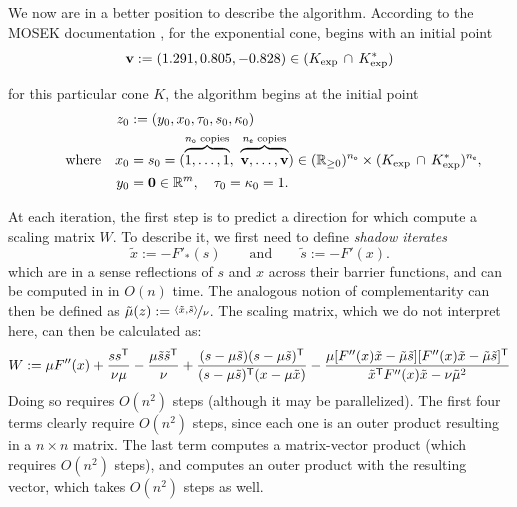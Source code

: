 \begin{subappendices}
\begin{lproof}
    We now are in a better position to describe the algorithm.
    According to the MOSEK documentation \parencite{dahl2022primal},
        for the exponential cone,
            begins with an initial point
        \[
            \mathbf v := (1.291, 0.805, -0.828) \in (K_{\exp} \,\cap\, K_{\exp}^*)
        \]

        for this particular cone $K$,
    the algorithm begins at the initial point
    \begin{align*}
        z_0 &:= (y_0, x_0, \tau_0, s_0, \kappa_0) \\
        \qquad
                    \text{where}\quad
                x_0 &= s_0 = (\overbrace{\vphantom| 1, \ldots, 1}^{n_{\sf o} \text{ copies}},~
                    \overbrace{\vphantom|
                        \mat v, \ldots, \mat v}^{n_{\sf e}\text{ copies}})
                \in (\mathbb R_{\ge 0})^{n_{\sf o}} \times (K_{\exp} \,\cap\, K_{\exp}^*)^{n_{\sf e}}, \\
            \qquad
                y_0 &= \mat 0  \in \mathbb R^m,
            \quad
                \tau_0 = \kappa_0 = 1.
    \end{align*}

    \def\daff#1{\Delta {#1}^{\text{aff}}}
    \def\dcen#1{\Delta {#1}^{\text{cen}}}

    At each iteration, the first step is to predict a direction for which
    \textcite{badenbroek2021algorithm}
    compute a scaling matrix $W$.
    To describe it, we first need to define \emph{shadow iterates}
    \[
        \tilde x := -F'_*(s)
        \qquad \text{and} \qquad
        \tilde s := - F'(x).
    \]
    which are in a sense reflections of $s$ and $x$ across their barrier functions, and can be computed in in $O(n)$ time.
    The analogous notion of complementarity can then be defined as $\tilde \mu(z) := \nicefrac{\langle \tilde x, \tilde s \rangle}{\nu}$.
    The scaling matrix, which we do not interpret here, can then be calculated as:
    \begin{equation}
        W :=
            \mu F''(x) + \frac{s s^{\sf T}}{\nu \mu}
            - \frac{\mu \tilde s \tilde s^{\sf T}}{\nu}
            + \frac{(s- \mu\tilde s)(s-\mu\tilde s)^{\sf T}}
                    {(s-\mu\tilde s)^{\sf T} (x - \mu \tilde x) }
            - \frac{\mu [ F''(x) \tilde x - \tilde \mu \tilde s]
                [ F''(x) \tilde x - \tilde \mu \tilde s]^{\sf T}}
                { \tilde x^{\sf T} F''(x) \tilde x - \nu \tilde \mu^2}
        \label{eq:scalemat}
    \end{equation}
    Doing so requires $O(n^2)$ steps (although it may be parallelized).
    The first four terms clearly require $O(n^2)$ steps, since each one is an outer product resulting in a $n \times n$ matrix.
    The last term computes a matrix-vector product (which requires $O(n^2)$ steps), and computes an outer product with the resulting vector, which takes $O(n^2)$ steps as well.


\end{lproof}
\end{subappendices}
